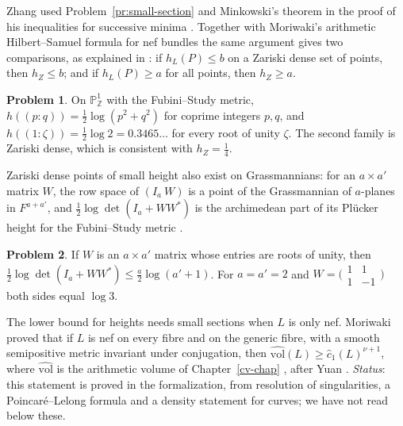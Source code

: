 \documentclass[reqno]{amsart}
\newcounter{chap}
\theoremstyle{definition}
\newtheorem{problem}{Problem}[section]
\theoremstyle{plain}
\theoremstyle{remark}
\newcommand{\Z}{\mathbb Z}
\newcommand{\Pb}{\mathbb P}
\newcommand{\cc}{\hat{c}_1}
\newcommand{\vol}{\widehat{\mathrm{vol}}}
\begin{document}
Zhang used Problem~\ref{pr:small-section} and Minkowski's theorem in the proof of his inequalities for successive minima \cite[proof of Thm.~5.2]{Zha}.  Together with Moriwaki's arithmetic Hilbert--Samuel formula for nef bundles \cite{Mo} the same argument gives two comparisons, as explained in \cite[\S4.3]{Zh}: if \(h_L(P) \le b\) on a Zariski dense set of points, then \(h_Z \le b\); and if \(h_L(P) \ge a\) for all points, then \(h_Z \ge a\).

\begin{problem}\label{pr:P1-points}
On \(\Pb^1_\Z\) with the Fubini--Study metric, \(h((p:q)) = \frac12\log(p^2 + q^2)\) for coprime integers \(p, q\), and \(h((1:\zeta)) = \frac12\log2 = 0.3465\ldots\) for every root of unity \(\zeta\).  The second family is Zariski dense, which is consistent with \(h_Z = \frac14\).
\end{problem}

Zariski dense points of small height also exist on Grassmannians: for an \(a \times a'\) matrix \(W\), the row space of \((I_a\ W)\) is a point of the Grassmannian of \(a\)-planes in \(F^{a+a'}\), and \(\frac12\log\det(I_a + WW^*)\) is the archimedean part of its Pl\"ucker height for the Fubini--Study metric \cite[\S4.3]{Zh}.

\begin{problem}\label{pr:grassmann}
If \(W\) is an \(a \times a'\) matrix whose entries are roots of unity, then \(\frac12\log\det(I_a + WW^*) \le \frac a2\log(a' + 1)\).  For \(a = a' = 2\) and \(W = \bigl(\begin{smallmatrix}1&1\\1&-1\end{smallmatrix}\bigr)\) both sides equal \(\log3\).
\end{problem}

The lower bound for heights needs small sections when \(L\) is only nef.  Moriwaki proved that if \(L\) is nef on every fibre and on the generic fibre, with a smooth semipositive metric invariant under conjugation, then \(\vol(L) \ge \cc(L)^{\nu+1}\), where \(\vol\) is the arithmetic volume of Chapter~\ref{cv-chap} \cite{Mo}, after Yuan \cite{Yu}.  \emph{Status}: this statement is proved in the formalization, from resolution of singularities, a Poincar\'e--Lelong formula and a density statement for curves; we have not read below these.
\end{document}
